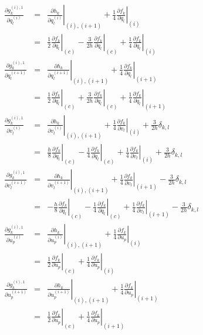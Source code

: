 \documentclass[a4paper]{article}
\begin{document}
\begin{eqnarray}
\frac{\partial g_k^{(i),1}}{\partial q_l^{(i)}}
&=& \left. \frac{\partial h_k}{\partial q_l^{(i)}} \right|_{(i), (i+1)}
 + \frac{1}{4} \left. \frac{\partial f_k}{\partial q_l} \right|_{(i)}\\
&=& \frac{1}{2} \left. \frac{\partial f_k}{\partial q_l} \right|_{(c)}
 - \frac{3}{2h} \left. \frac{\partial f_k}{\partial \dot{q}_l} \right|_{(c)}
 + \frac{1}{4} \left. \frac{\partial f_k}{\partial q_l} \right|_{(i)}
\nonumber\\
\frac{\partial g_k^{(i),1}}{\partial q_l^{(i+1)}}
&=& \left. \frac{\partial h_k}{\partial q_l^{(i+1)}} \right|_{(i), (i+1)}
 + \frac{1}{4} \left. \frac{\partial f_k}{\partial q_l} \right|_{(i+1)}\\
 &=& \frac{1}{2} \left. \frac{\partial f_k}{\partial q_l} \right|_{(c)}
 + \frac{3}{2h} \left. \frac{\partial f_k}{\partial \dot{q}_l} \right|_{(c)}
 + \frac{1}{4} \left. \frac{\partial f_k}{\partial q_l} \right|_{(i+1)}
\nonumber\\
\frac{\partial g_k^{(i),1}}{\partial v_l^{(i)}}
&=& \left. \frac{\partial h_k}{\partial v_l^{(i)}} \right|_{(i), (i+1)}
 + \frac{1}{4} \left. \frac{\partial f_k}{\partial v_l} \right|_{(i)}
 + \frac{3}{2h} \delta_{k,l}\\
&=& \frac{h}{8} \left. \frac{\partial f_k}{\partial q_l} \right|_{(c)}
 - \frac{1}{4} \left. \frac{\partial f_k}{\partial \dot{q}_l} \right|_{(c)}
 + \frac{1}{4} \left. \frac{\partial f_k}{\partial v_l} \right|_{(i)}
 + \frac{3}{2h} \delta_{k,l}
\nonumber\\
\frac{\partial g_k^{(i),1}}{\partial v_l^{(i+1)}}
&=& \left. \frac{\partial h_k}{\partial v_l^{(i+1)}} \right|_{(i), (i+1)}
 + \frac{1}{4} \left. \frac{\partial f_k}{\partial v_l} \right|_{(i+1)}
 - \frac{3}{2h} \delta_{k,l}\\
&=& - \frac{h}{8} \left. \frac{\partial f_k}{\partial q_l} \right|_{(c)}
 - \frac{1}{4} \left. \frac{\partial f_k}{\partial \dot{q}_l} \right|_{(c)}
 + \frac{1}{4} \left. \frac{\partial f_k}{\partial v_l} \right|_{(i+1)}
 - \frac{3}{2h} \delta_{k,l}
\nonumber\\
\frac{\partial g_k^{(i),1}}{\partial u_p^{(i)}}
&=& \left. \frac{\partial h_k}{\partial u_p^{(i)}} \right|_{(i), (i+1)}
 + \frac{1}{4} \left. \frac{\partial f_k}{\partial u_p} \right|_{(i)}\\
&=& \frac{1}{2} \left. \frac{\partial f_k}{\partial u_p} \right|_{(c)}
 + \frac{1}{4} \left. \frac{\partial f_k}{\partial u_p} \right|_{(i)}
\nonumber\\
\frac{\partial g_k^{(i),1}}{\partial u_p^{(i+1)}}
&=& \left. \frac{\partial h_k}{\partial u_p^{(i+1)}} \right|_{(i), (i+1)}
 + \frac{1}{4} \left. \frac{\partial f_k}{\partial u_p}\right|_{(i+1)}\\
&=& \frac{1}{2} \left. \frac{\partial f_k}{\partial u_p} \right|_{(c)}
 + \frac{1}{4} \left. \frac{\partial f_k}{\partial u_p}\right|_{(i+1)}
\nonumber
\end{eqnarray}
\end{document}
